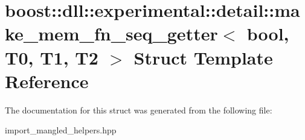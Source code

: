 \hypertarget{a01484}{}\section{boost\+:\+:dll\+:\+:experimental\+:\+:detail\+:\+:make\+\_\+mem\+\_\+fn\+\_\+seq\+\_\+getter$<$ bool, T0, T1, T2 $>$ Struct Template Reference}
\label{a01484}


The documentation for this struct was generated from the following file\+:\begin{DoxyCompactItemize}
\item 
import\+\_\+mangled\+\_\+helpers.\+hpp\end{DoxyCompactItemize}
